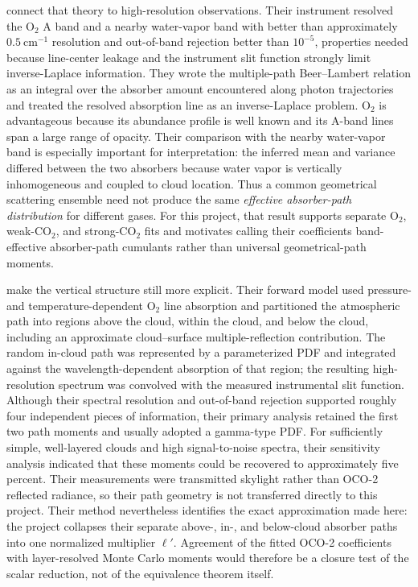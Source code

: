 \documentclass[11pt]{article}
\newcommand{\lp}{\ell'}
\begin{document}
\citet{min2004} connect that theory to high-resolution observations.  Their
instrument resolved the O$_2$ A band and a nearby water-vapor band with better
than approximately $0.5\ \mathrm{cm}^{-1}$ resolution and out-of-band rejection
better than $10^{-5}$, properties needed because line-center leakage and the
instrument slit function strongly limit inverse-Laplace information.  They
wrote the multiple-path Beer--Lambert relation as an integral over the absorber
amount encountered along photon trajectories and treated the resolved
absorption line as an inverse-Laplace problem.  O$_2$ is advantageous because
its abundance profile is well known and its A-band lines span a large range of
opacity.  Their comparison with the nearby water-vapor band is especially
important for interpretation: the inferred mean and variance differed between
the two absorbers because water vapor is vertically inhomogeneous and coupled
to cloud location.  Thus a common geometrical scattering ensemble need not
produce the same \emph{effective absorber-path distribution} for different
gases.  For this project, that result supports separate O$_2$, weak-CO$_2$, and
strong-CO$_2$ fits and motivates calling their coefficients band-effective
absorber-path cumulants rather than universal geometrical-path moments.

\citet{scholl2006} make the vertical structure still more explicit.  Their
forward model used pressure- and temperature-dependent O$_2$ line absorption
and partitioned the atmospheric path into regions above the cloud, within the
cloud, and below the cloud, including an approximate cloud--surface
multiple-reflection contribution.  The random in-cloud path was represented by
a parameterized PDF and integrated against the wavelength-dependent absorption
of that region; the resulting high-resolution spectrum was convolved with the
measured instrumental slit function.  Although their spectral resolution and
out-of-band rejection supported roughly four independent pieces of
information, their primary analysis retained the first two path moments and
usually adopted a gamma-type PDF.  For sufficiently simple, well-layered
clouds and high signal-to-noise spectra, their sensitivity analysis indicated
that these moments could be recovered to approximately five percent.  Their
measurements were transmitted skylight rather than OCO-2 reflected radiance,
so their path geometry is not transferred directly to this project.  Their
method nevertheless identifies the exact approximation made here: the project
collapses their separate above-, in-, and below-cloud absorber paths into one
normalized multiplier $\lp$.  Agreement of the fitted OCO-2 coefficients with
layer-resolved Monte Carlo moments would therefore be a closure test of the
scalar reduction, not of the equivalence theorem itself.
\end{document}
